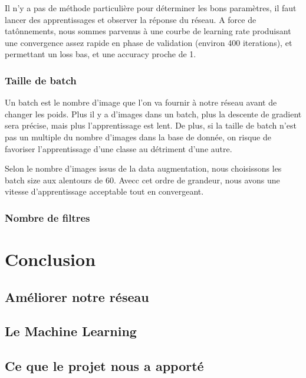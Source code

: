 \documentclass[a4paper,12pt]{article}
\begin{document}
      Il n'y a pas de méthode particulière pour déterminer les bons paramètres, il faut lancer des apprentissages et observer la réponse du réseau. A force de tatônnements, nous sommes parvenus à une courbe de learning rate produisant une convergence assez rapide en phase de validation (environ 400 iterations), et permettant un loss bas, et une accuracy proche de 1.

    \subsubsection{Taille de batch}
      Un batch est le nombre d'image que l'on va fournir à notre réseau avant de changer les poids. Plus il y a d'images dans un batch, plus la descente de gradient sera précise, mais plus l'apprentissage est lent. De plus, si la taille de batch n'est pas un multiple du nombre d'images dans la base de donnée, on risque de favoriser l'apprentissage d'une classe au détriment d'une autre. 

      Selon le nombre d'images issus de la data augmentation, nous choisissons les batch size aux alentours de 60. Avecc cet ordre de grandeur, nous avons une vitesse d'apprentissage acceptable tout en convergeant.
    \subsubsection{Nombre de filtres}
      

\newpage
\section*{Conclusion}
  
  \subsection*{Améliorer notre réseau}
  
  \subsection*{Le Machine Learning}
  
  \subsection*{Ce que le projet nous a apporté}
\end{document}
